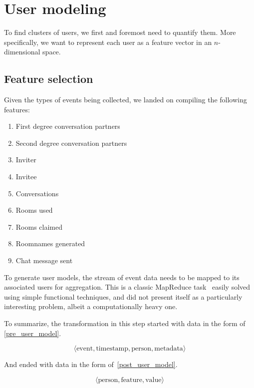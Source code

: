
\section{User modeling} %
\label{approach:sec:user_modeling}

To find clusters of users, we first and foremost need to quantify them. More specifically, we want to represent each user as a feature vector in an $n$-dimensional space.

\subsection{Feature selection}
\label{approach:sec:feature_selection}

Given the types of events being collected, we landed on compiling the following features:

\begin{enumerate}
  \item First degree conversation partners
  \item Second degree conversation partners
  \item Inviter
  \item Invitee
  \item Conversations
  \item Rooms used
  \item Rooms claimed
  \item Roomnames generated
  \item Chat message sent
\end{enumerate}

To generate user models, the stream of event data needs to be mapped to its associated users for aggregation. This is a classic MapReduce task~\cite{Dean2008} easily solved using simple functional techniques, and did not present itself as a particularly interesting problem, albeit a computationally heavy one.

To summarize, the transformation in this step started with data in the form of \eqref{pre_user_model}.

\begin{equation}
  \langle \text{event}, \text{timestamp}, \text{person}, \text{metadata} \rangle
  \label{pre_user_model}
\end{equation}

And ended with data in the form of~\eqref{post_user_model}.

\begin{equation}
  \langle \text{person}, \text{feature}, \text{value} \rangle
  \label{post_user_model}
\end{equation}

